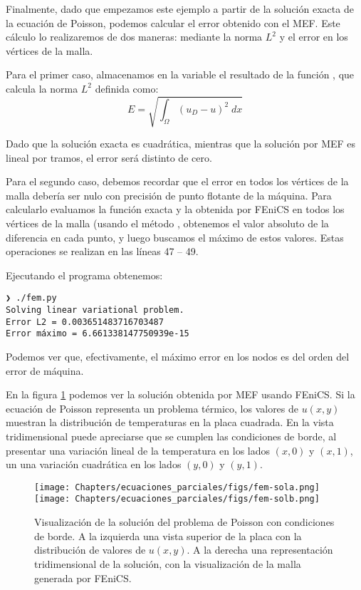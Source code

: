 Finalmente, dado que empezamos este ejemplo a partir de la solución exacta de la ecuación de Poisson, podemos calcular el error obtenido con el MEF. Este cálculo lo realizaremos de dos maneras: mediante la norma $L^2$ y el error en los vértices de la malla.

Para el primer caso, almacenamos en la variable  el resultado de la función , que calcula la norma $L^2$ definida como:
\begin{equation}
 E = \sqrt{\int_{\Omega} (u_D - u)^2 \; dx}
\end{equation} 

Dado que la solución exacta es cuadrática, mientras que la solución por MEF es lineal por tramos, el error será distinto de cero.

Para el segundo caso, debemos recordar que el error en todos los vértices de la malla debería ser nulo con precisión de punto flotante de la máquina. Para calcularlo evaluamos la función exacta y la obtenida por FEniCS en todos los vértices de la malla (usando el método , obtenemos el valor absoluto de la diferencia en cada punto, y luego buscamos el máximo de estos valores. Estas operaciones se realizan en las líneas 47 -- 49.

Ejecutando el programa obtenemos:
\begin{verbatim}
❯ ./fem.py 
Solving linear variational problem.
Error L2 = 0.003651483716703487
Error máximo = 6.661338147750939e-15
\end{verbatim}

Podemos ver que, efectivamente, el máximo error en los nodos es del orden del error de máquina.

En la figura \ref{fig:fem-sol} podemos ver la solución obtenida por MEF usando FEniCS. Si la ecuación de Poisson representa un problema térmico, los valores de $u(x,y)$ muestran la distribución de temperaturas en la placa cuadrada. En la vista tridimensional puede apreciarse que se cumplen las condiciones de borde, al presentar una variación lineal de la temperatura en los lados $(x, 0)$ y $(x, 1)$, un una variación cuadrática en los lados $(y, 0)$ y $(y, 1)$.

\begin{figure}[ht]
 \centering
 \texttt{[image: Chapters/ecuaciones\_parciales/figs/fem-sola.png]}
 \quad
 \texttt{[image: Chapters/ecuaciones\_parciales/figs/fem-solb.png]}
 \caption{Visualización de la solución del problema de Poisson con condiciones de borde. A la izquierda una vista superior de la placa con la distribución de valores de $u(x,y)$. A la derecha una representación tridimensional de la solución, con la visualización de la malla generada por FEniCS.}
 \label{fig:fem-sol}
\end{figure}

